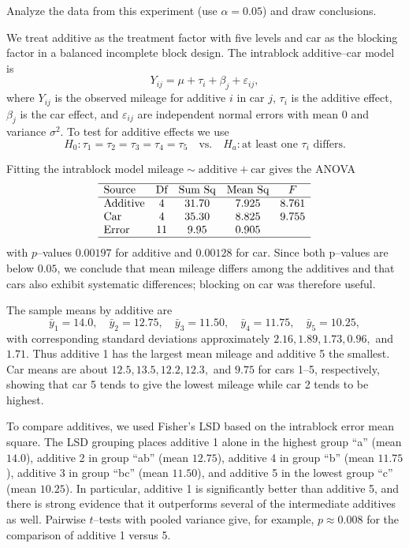 \documentclass[answers,12pt,addpoints]{exam}
\begin{document}
\begin{questions}
Analyze the data from this experiment (use $\alpha = 0.05$) and draw conclusions.
  
\begin{solution}
We treat additive as the treatment factor with five levels and car as the blocking
factor in a balanced incomplete block design. The intrablock additive–car model is
\[
Y_{ij} = \mu + \tau_i + \beta_j + \varepsilon_{ij},
\]
where $Y_{ij}$ is the observed mileage for additive $i$ in car $j$, $\tau_i$ is the
additive effect, $\beta_j$ is the car effect, and $\varepsilon_{ij}$ are independent
normal errors with mean $0$ and variance $\sigma^2$. To test for additive effects we use
\[
H_0:\tau_1 = \tau_2 = \tau_3 = \tau_4 = \tau_5
\quad\text{vs.}\quad
H_a:\text{at least one }\tau_i\text{ differs}.
\]

Fitting the intrablock model $\text{mileage} \sim \text{additive} + \text{car}$ gives
the ANOVA
\[
\begin{array}{lcccc}
\hline
\text{Source} & \text{Df} & \text{Sum Sq} & \text{Mean Sq} & F \\
\hline
\text{Additive} & 4 & 31.70 & 7.925 & 8.761 \\
\text{Car}      & 4 & 35.30 & 8.825 & 9.755 \\
\text{Error}    &11 &  9.95 & 0.905 &       \\
\hline
\end{array}
\]
with $p$–values $0.00197$ for additive and $0.00128$ for car. Since both
p–values are below $0.05$, we conclude that mean mileage differs among the additives
and that cars also exhibit systematic differences; blocking on car was therefore
useful.

The sample means by additive are
\[
\bar y_1 = 14.0,\quad
\bar y_2 = 12.75,\quad
\bar y_3 = 11.50,\quad
\bar y_4 = 11.75,\quad
\bar y_5 = 10.25,
\]
with corresponding standard deviations approximately $2.16, 1.89, 1.73, 0.96,$ and
$1.71$. Thus additive 1 has the largest mean mileage and additive 5 the smallest.
Car means are about $12.5, 13.5, 12.2, 12.3,$ and $9.75$ for cars 1–5, respectively,
showing that car 5 tends to give the lowest mileage while car 2 tends to be highest.

To compare additives, we used Fisher’s LSD based on the intrablock error mean
square. The LSD grouping places additive 1 alone in the highest group ``a''
(mean $14.0$), additive 2 in group ``ab'' (mean $12.75$), additive 4 in group ``b''
(mean $11.75$), additive 3 in group ``bc'' (mean $11.50$), and additive 5 in the
lowest group ``c'' (mean $10.25$). In particular, additive 1 is significantly better
than additive 5, and there is strong evidence that it outperforms several of the
intermediate additives as well. Pairwise $t$–tests with pooled variance give, for
example, $p \approx 0.008$ for the comparison of additive 1 versus 5.


\end{solution}
\end{questions}
\end{document}
